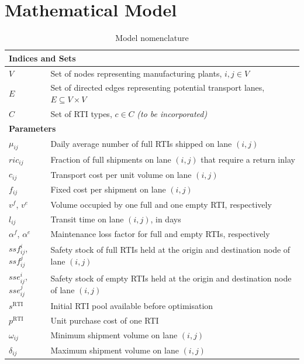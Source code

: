 \section{Mathematical Model}

\begin{longtable}{|p{}|p{}|}
\caption{Model nomenclature}
\label{tab:nomenclature}\\
\hline
\multicolumn{2}{|l|}{\textbf{Indices and Sets}}\\ \hline
$V$          & Set of nodes representing manufacturing plants, $i,j \in V$ \\
$E$          & Set of directed edges representing potential transport lanes,
               $E \subseteq V \times V$ \\
$C$          & Set of RTI types, $c \in C$ \textit{(to be incorporated)} \\
\hline
\multicolumn{2}{|l|}{\textbf{Parameters}}\\ \hline
$\mu_{ij}$        & Daily average number of full RTIs shipped on lane $(i,j)$ \\
$ric_{ij}$        & Fraction of full shipments on lane $(i,j)$ that require a
                    return inlay \\
$c_{ij}$          & Transport cost per unit volume on lane $(i,j)$ \\
$f_{ij}$          & Fixed cost per shipment on lane $(i,j)$ \\
$v^{f}$, $v^{e}$  & Volume occupied by one full and one empty RTI,
                    respectively \\
$l_{ij}$          & Transit time on lane $(i,j)$, in days \\
$\alpha^{f}$, $\alpha^{e}$ & Maintenance loss factor for full and empty RTIs,
                    respectively \\
$ssf^{i}_{ij}$, $ssf^{j}_{ij}$ & Safety stock of full RTIs held at the origin
                    and destination node of lane $(i,j)$ \\
$sse^{i}_{ij}$, $sse^{j}_{ij}$ & Safety stock of empty RTIs held at the origin
                    and destination node of lane $(i,j)$ \\
$s^{\text{RTI}}$  & Initial RTI pool available before optimisation \\
$p^{\text{RTI}}$  & Unit purchase cost of one RTI \\
$\omega_{ij}$     & Minimum shipment volume on lane $(i,j)$ \\
$\delta_{ij}$     & Maximum shipment volume on lane $(i,j)$ \\

\end{longtable}
